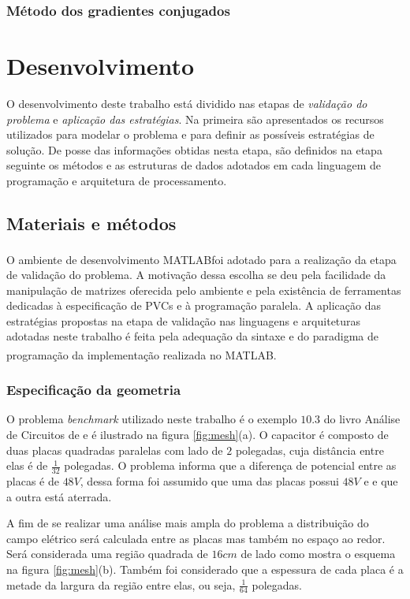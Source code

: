 \documentclass[
    12pt,               %
    openright,          %
    oneside,
    a4paper,            %
    english,            %
    french,             %
    spanish,            %
    brazil              %
    ]{abntex2}
\newcommand{\matlab}{MATLAB\textsuperscript{\textregistered}}
\begin{document}
\subsection{Método dos gradientes conjugados}
\label{sec:CG}

\chapter{Desenvolvimento}

O desenvolvimento deste trabalho está  dividido nas etapas de \textit{validação do problema} e \textit{aplicação das estratégias}. Na primeira são apresentados os recursos utilizados para modelar o problema e para definir as possíveis estratégias de solução. De posse das informações obtidas nesta etapa, são definidos na etapa seguinte os métodos e as estruturas de dados adotados em cada linguagem de programação e arquitetura de processamento.

\section{Materiais e métodos}
O ambiente de desenvolvimento \matlab foi adotado para a realização da etapa de validação do problema. A motivação dessa escolha se deu pela facilidade da manipulação de matrizes oferecida pelo ambiente e pela existência de ferramentas dedicadas à especificação de PVCs e à programação paralela.
A aplicação das estratégias propostas na etapa de validação nas linguagens e arquiteturas adotadas neste trabalho é feita pela adequação da sintaxe e do paradigma de programação da implementação realizada no \matlab. 

\subsection{Especificação da geometria}
O problema \textit{benchmark} utilizado neste trabalho é o exemplo $10.3$ do livro Análise de Circuitos de  e é ilustrado na figura \ref{fig:mesh}{(a)}. O capacitor é composto de duas placas quadradas paralelas com lado de $2$ polegadas, cuja distância entre elas é de $\frac{1}{32}$ polegadas. O problema informa que a diferença de potencial entre as placas é de $48V$, dessa forma foi assumido que uma das placas possui $48V$ e e que a outra está aterrada.

A fim de se realizar uma análise mais ampla do problema a distribuição do campo elétrico será calculada entre as placas mas também no espaço ao redor. Será considerada uma região quadrada de $16cm$ de lado como mostra o esquema na figura \ref{fig:mesh}{(b)}. Também foi considerado que a espessura de cada placa é a metade da largura da região entre elas, ou seja, $\frac{1}{64}$ polegadas.
\end{document}

